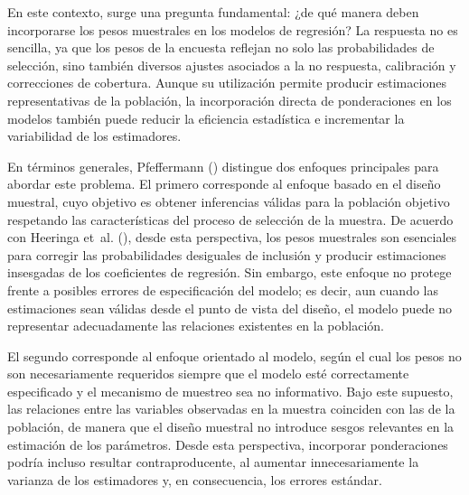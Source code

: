 \documentclass[
  spanish,
  11pt,
  letterpaper,
  oneside,
  open=any]{scrbook}
\begin{document}
En este contexto, surge una pregunta fundamental: ¿de qué manera deben
incorporarse los pesos muestrales en los modelos de regresión? La
respuesta no es sencilla, ya que los pesos de la encuesta reflejan no
solo las probabilidades de selección, sino también diversos ajustes
asociados a la no respuesta, calibración y correcciones de cobertura.
Aunque su utilización permite producir estimaciones representativas de
la población, la incorporación directa de ponderaciones en los modelos
también puede reducir la eficiencia estadística e incrementar la
variabilidad de los estimadores.

En términos generales, Pfeffermann
() distingue dos enfoques
principales para abordar este problema. El primero corresponde al
enfoque basado en el diseño muestral, cuyo objetivo es obtener
inferencias válidas para la población objetivo respetando las
características del proceso de selección de la muestra. De acuerdo con
Heeringa et~al. (), desde
esta perspectiva, los pesos muestrales son esenciales para corregir las
probabilidades desiguales de inclusión y producir estimaciones
insesgadas de los coeficientes de regresión. Sin embargo, este enfoque
no protege frente a posibles errores de especificación del modelo; es
decir, aun cuando las estimaciones sean válidas desde el punto de vista
del diseño, el modelo puede no representar adecuadamente las relaciones
existentes en la población.

El segundo corresponde al enfoque orientado al modelo, según el cual los
pesos no son necesariamente requeridos siempre que el modelo esté
correctamente especificado y el mecanismo de muestreo sea no
informativo. Bajo este supuesto, las relaciones entre las variables
observadas en la muestra coinciden con las de la población, de manera
que el diseño muestral no introduce sesgos relevantes en la estimación
de los parámetros. Desde esta perspectiva, incorporar ponderaciones
podría incluso resultar contraproducente, al aumentar innecesariamente
la varianza de los estimadores y, en consecuencia, los errores estándar.
\end{document}
